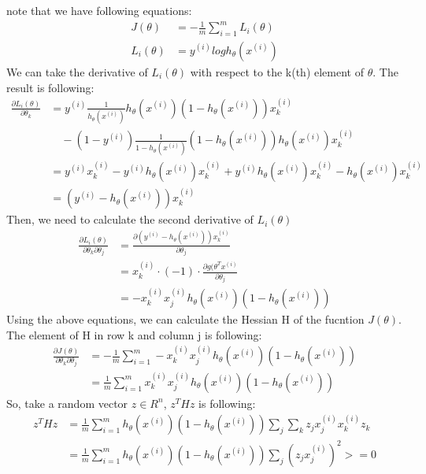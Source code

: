 \begin{answer}
note that we have following equations:
\begin{align*}
J(\theta) &= - \frac{1}{m} \sum \limits_{i=1}^m L_i(\theta)\\
L_i(\theta) &= y^{(i)}log h_\theta(x^{(i)})
\end{align*}
We can take the derivative of $L_i(\theta)$ with respect to the k(th) element of $\theta$. The result is following:
\begin{align*}
\frac{\partial L_i(\theta)}{\partial \theta_k} &= y^{(i)}\frac{1}{h_\theta(x^{(i)})}h_\theta(x^{(i)})(1-h_\theta(x^{(i)}))x^{(i)}_k\\&\quad-(1-y^{(i)})\frac{1}{1-h_\theta(x^{(i)})}(1-h_\theta(x^{(i)}))h_\theta(x^{(i)})x^{(i)}_k\\
&=y^{(i)}x^{(i)}_k - y^{(i)}h_\theta(x^{(i)})x^{(i)}_k+y^{(i)}h_\theta(x^{(i)})x^{(i)}_k-h_\theta(x^{(i)})x^{(i)}_k\\
&=(y^{(i)}-h_\theta(x^{(i)}))x^{(i)}_k
\end{align*}
Then, we need to calculate the second derivative of $L_i(\theta)$
\begin{align*}
    \frac{\partial L_i(\theta)}{\partial \theta_k \partial \theta_j} &= \frac{\partial (y^{(i)}-h_\theta(x^{(i)}))x^{(i)}_k}{\partial \theta_j}\\
    &=x^{(i)}_k\cdot(-1)\cdot \frac{\partial g(\theta^T x^{(i)}}{\partial \theta_j}\\
    &=-x^{(i)}_k x^{(i)}_j h_\theta(x^{(i)}) (1 - h_\theta(x^{(i)}))
\end{align*}
Using the above equations, we can calculate the Hessian H of the fucntion $J(\theta)$. The element of H in row k and column j is following:
\begin{align*}
    \frac{\partial J(\theta)}{\partial \theta_k \partial \theta_j} &= - \frac{1}{m}\sum\limits_{i=1}^m -x^{(i)}_k x^{(i)}_j h_\theta(x^{(i)}) (1 - h_\theta(x^{(i)}))\\
    &= \frac{1}{m}\sum\limits_{i=1}^m x^{(i)}_k x^{(i)}_j h_\theta(x^{(i)}) (1 - h_\theta(x^{(i)}))
\end{align*}
So, take a random vector $z \in R^n$, $z^T H z$ is following:
\begin{align*}
    z^T H z &= \frac{1}{m}\sum\limits_{i=1}^m h_\theta(x^{(i)}) (1 - h_\theta(x^{(i)})) \sum\limits_j \sum\limits_k z_j x^{(i)}_j x^{(i)}_k z_k\\
    &= \frac{1}{m}\sum\limits_{i=1}^m h_\theta(x^{(i)}) (1 - h_\theta(x^{(i)})) \sum\limits_j (z_j x^{(i)}_j)^2 >= 0
\end{align*}
\end{answer}
